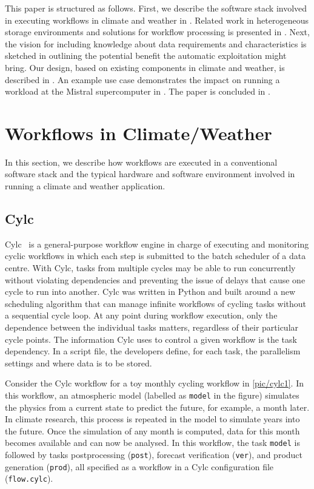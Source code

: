 \documentclass{superfri}
\begin{document}
This paper is structured as follows.
First, we describe the software stack involved in executing workflows in climate and weather in .
Related work in heterogeneous storage environments and solutions for workflow processing is presented in .
Next, the vision for including knowledge about data requirements and characteristics is sketched in  outlining the potential benefit the automatic exploitation might bring.
Our design, based on existing components in climate and weather, is described in .
An example use case demonstrates the impact on running a workload at the Mistral supercomputer in .
The paper is concluded in .

\section{Workflows in Climate/Weather}
\label{sec:workflows}

In this section, we describe how workflows are executed in a conventional software stack and the typical hardware and software environment involved in running a climate and weather application.

\subsection{Cylc}

Cylc~\cite{8675433} is a general-purpose workflow engine in charge of executing and monitoring cyclic workflows in which each step is submitted to the batch scheduler of a data centre.
With Cylc, tasks from multiple cycles may be able to run concurrently without violating dependencies and preventing the issue of delays that cause one cycle to run into another.
Cylc was written in Python and built around a new scheduling algorithm that can manage infinite workflows of cycling tasks without a sequential cycle loop.
At any point during workflow execution, only the dependence between the individual tasks matters, regardless of their particular cycle points.
The information Cylc uses to control a given workflow is the task dependency.
In a script file, the developers define, for each task, the parallelism settings and where data is to be stored.


Consider the Cylc workflow for a toy monthly cycling workflow in \cref{pic/cylc1}.
In this workflow, an atmospheric model (labelled as \texttt{model} in the figure) simulates the physics from a current state to predict the future, for example, a month later.
In climate research, this process is repeated in the model to simulate years into the future.
Once the simulation of any month is computed, data for this month becomes available and can now be analysed.
In this workflow, the task \texttt{model} is followed by tasks postprocessing (\texttt{post}), forecast verification (\texttt{ver}), and product generation (\texttt{prod}), all specified as a workflow in a Cylc configuration file (\texttt{flow.cylc}).
\end{document}
